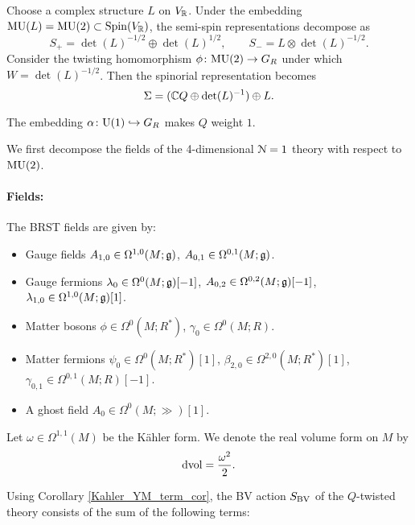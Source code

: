 \documentclass[10pt, oneside]{article}
\begin{document}
Choose a complex structure $L$ on $V_\mathbb R$. Under the embedding $\mathrm{MU}(L) = \mathrm{MU}(2) \subset \mathrm{Spin}(V_\mathbb R)$, the semi-spin representations decompose as
\[
S_+ = \det(L)^{-1/2} \oplus \det(L)^{1/2},\qquad S_- = L \otimes \det(L)^{-1/2} .
\]
Consider the twisting homomorphism $\phi\colon\mathrm{MU}(2)\rightarrow G_R$ under which $W = \det(L)^{-1/2}$. Then the spinorial representation becomes
\[\Sigma = (\mathbb C Q\oplus \det(L)^{-1})\oplus L.\]

The embedding $\alpha\colon \mathrm{U}(1)\hookrightarrow G_R$ makes $Q$ weight $1$.

We first decompose the fields of the 4-dimensional $\mathcal{N}=1$ theory with respect to $\mathrm{MU}(2)$.
\vspace{-10pt}
\paragraph{Fields:} The BRST fields are given by:
\begin{itemize}
\item Gauge fields $A_{1, 0} \in \Omega^{1, 0}(M; \mathfrak g)$, $A_{0, 1}\in\Omega^{0, 1}(M; \mathfrak g)$.
\item Gauge fermions $\lambda_0\in\Omega^0(M; \mathfrak g)[-1]$, $A_{0, 2}\in\Omega^{0, 2}(M; \mathfrak g)[-1]$, $\lambda_{1, 0}\in\Omega^{1, 0}(M; \mathfrak g)[1]$.
\item Matter bosons $\phi\in\Omega^0(M; R^*)$, $\gamma_0\in\Omega^0(M; R)$.
\item Matter fermions $\psi_0\in\Omega^0(M; R^*)[1]$, $\beta_{2, 0}\in\Omega^{2, 0}(M; R^*)[1]$, $\gamma_{0, 1}\in\Omega^{0, 1}(M; R)[-1]$.
\item A ghost field $A_0\in \Omega^0(M; \gg)[1]$.
\end{itemize}

Let $\omega\in\Omega^{1, 1}(M)$ be the K\"ahler form. We denote the real volume form on $M$ by
\[\operatorname{dvol} = \frac{\omega^2}{2}.\]

Using Corollary \ref{Kahler_YM_term_cor}, the BV action $S_{\mathrm{BV}}$ of the $Q$-twisted theory consists of the sum of the following terms:
\end{document}
